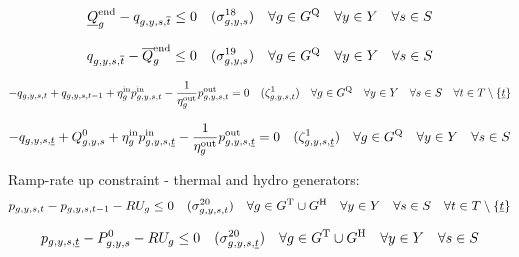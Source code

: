 \documentclass{article}
\newcommand{\sScenarioSets}{\quad \forall \iYear \in \sYears \quad \forall \iScenario \in \sScenarios \quad \forall \iInterval \in \sIntervals}
\begin{document}
\begin{equation}
	\cStorageUnitEnergyIntervalEndMin - \vStorageUnitEnergy[\iGenerator,\iYear,\iScenario,\iIntervalTerminal]\leq  0 \quad (\dMinStorageEnergyIntervalEnd) \quad \forall \iGenerator \in \sStorage \quad \forall \iYear \in \sYears \quad \forall \iScenario \in \sScenarios
\end{equation}

\begin{equation}
	\vStorageUnitEnergy[\iGenerator,\iYear,\iScenario,\iIntervalTerminal] - \cStorageUnitEnergyIntervalEndMax \leq  0 \quad (\dMaxStorageEnergyIntervalEnd) \quad \forall \iGenerator \in \sStorage \quad \forall \iYear \in \sYears \quad \forall \iScenario \in \sScenarios
\end{equation}

\begin{equation}
	- \vStorageUnitEnergy + \vStorageUnitEnergy[\iGenerator,\iYear,\iScenario,\iInterval-1] + \cStorageUnitEfficiencyCharging \vPowerIn - \frac{1}{\cStorageUnitEfficiencyDischarging} \vPowerOut = 0 \quad (\dStorageEnergyTransition) \quad \forall \iGenerator \in \sStorage \sScenarioSets \setminus \{\iIntervalStart\}
\end{equation}

\begin{equation}
	- \vStorageUnitEnergy[\iGenerator,\iYear,\iScenario,\iIntervalStart] + \cStorageEnergyInitial + \cStorageUnitEfficiencyCharging \vPowerIn[\iGenerator,\iYear,\iScenario,\iIntervalStart] - \frac{1}{\cStorageUnitEfficiencyDischarging} \vPowerOut[\iGenerator,\iYear,\iScenario,\iIntervalStart] = 0 \quad (\dStorageEnergyTransition[\iGenerator,\iYear,\iScenario,\iIntervalStart]) \quad \forall \iGenerator \in \sStorage \quad \forall \iYear \in \sYears \quad \forall \iScenario \in \sScenarios
\end{equation}

Ramp-rate up constraint - thermal and hydro generators:
\begin{equation}
	\vPower - \vPower[\iGenerator,\iYear,\iScenario,\iInterval-1] - \cRampRateUp \leq 0 \quad (\dRampRateUp) \quad \forall \iGenerator \in \sGeneratorsThermal \cup \sGeneratorsHydro \quad \forall \iYear \in \sYears \quad \forall \iScenario \in \sScenarios \quad \forall \iInterval \in \sIntervals \setminus \{\iIntervalStart\}
\end{equation}

\begin{equation}
	\vPower[\iGenerator,\iYear,\iScenario,\iIntervalStart] - \cPowerInitial - \cRampRateUp \leq 0 \quad (\dRampRateUp[\iGenerator,\iYear,\iScenario,\iIntervalStart]) \quad \forall \iGenerator \in \sGeneratorsThermal \cup \sGeneratorsHydro \quad \forall \iYear \in \sYears \quad \forall \iScenario \in \sScenarios
\end{equation}
\end{document}
